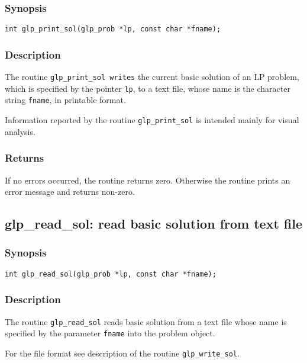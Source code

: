 \subsubsection*{Synopsis}

\begin{verbatim}
int glp_print_sol(glp_prob *lp, const char *fname);
\end{verbatim}

\subsubsection*{Description}

The routine \verb|glp_print_sol writes| the current basic solution of
an LP problem, which is specified by the pointer \verb|lp|, to a text
file, whose name is the character string \verb|fname|, in printable
format.

Information reported by the routine \verb|glp_print_sol| is intended
mainly for visual analysis.

\subsubsection*{Returns}

If no errors occurred, the routine returns zero. Otherwise the routine
prints an error message and returns non-zero.

\subsection{glp\_read\_sol: read basic solution from text file}

\subsubsection*{Synopsis}

\begin{verbatim}
int glp_read_sol(glp_prob *lp, const char *fname);
\end{verbatim}

\subsubsection*{Description}

The routine \verb|glp_read_sol| reads basic solution from a text file
whose name is specified by the parameter \verb|fname| into the problem
object.

For the file format see description of the routine \verb|glp_write_sol|.

